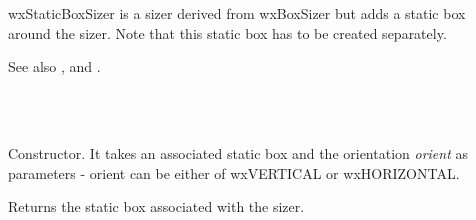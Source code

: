 \section{}\label{wxstaticboxsizer}

wxStaticBoxSizer is a sizer derived from wxBoxSizer but adds a static
box around the sizer. Note that this static box has to be created 
separately.

See also ,  and
 .


\\
\\


\label{wxstaticboxsizerwxstaticboxsizer}


Constructor. It takes an associated static box and the orientation {\it orient} 
as parameters - orient can be either of wxVERTICAL or wxHORIZONTAL.

\label{wxstaticboxsizergetstaticbox}


Returns the static box associated with the sizer.

